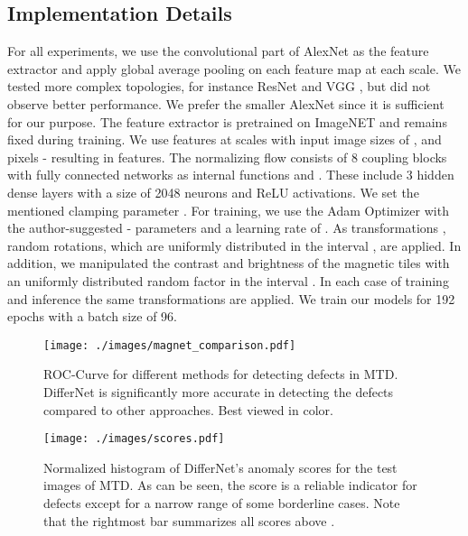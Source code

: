 \documentclass[10pt,twocolumn,letterpaper]{article}
\begin{document}
\subsection{Implementation Details}
\label{implementation}
For all experiments, we use the convolutional part of AlexNet \cite{alexnet} as the feature extractor and apply global average pooling on each feature map at each scale.
We tested more complex topologies, for instance ResNet \cite{resnet} and VGG \cite{VGG}, but did not observe better performance.
We prefer the smaller AlexNet since it is sufficient for our purpose.
The feature extractor is pretrained on ImageNET and remains fixed during training.
We use features at  scales with input image sizes of ,  and  pixels - resulting in  features.
The normalizing flow consists of 8 coupling blocks with fully connected networks as internal functions  and .
These include 3 hidden dense layers with a size of 2048 neurons and ReLU activations.
We set the mentioned clamping parameter .
For training, we use the Adam Optimizer \cite{adam} with the author-suggested - parameters and a learning rate of .
As transformations , random rotations, which are uniformly distributed in the interval , are applied.
In addition, we manipulated the contrast and brightness of the magnetic tiles with an uniformly distributed random factor in the interval .
In each case of training and inference the same transformations are applied.
We train our models for 192 epochs with a batch size of 96.

\begin{figure}
\centering
  \texttt{[image: ./images/magnet\_comparison.pdf]} 
 \caption{ROC-Curve for different methods for detecting defects in MTD. DifferNet is significantly more accurate in detecting the defects compared to other approaches. Best viewed in color.}
\label{fig:magnetroc}
\end{figure}

\begin{figure}
\centering
  \texttt{[image: ./images/scores.pdf]} 
 \caption{Normalized histogram of DifferNet's anomaly scores for the test images of MTD. As can be seen, the score is a reliable indicator for defects except for a narrow range of some borderline cases. Note that the rightmost bar summarizes all scores above .}
\label{fig:scores}
\end{figure}
\end{document}
